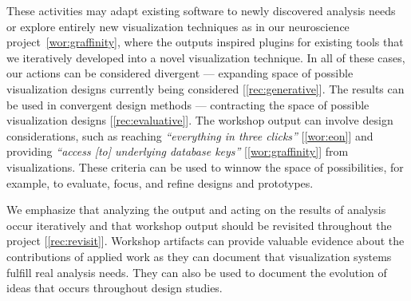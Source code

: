 These activities may adapt existing software to newly discovered analysis needs or explore entirely new visualization techniques as in our neuroscience project~\ref{wor:graffinity}, where the outputs inspired plugins for existing tools that we iteratively developed into a novel visualization technique. In all of these cases, our actions can be considered divergent --- expanding space of possible visualization designs currently being considered [\ref{rec:generative}]. The results can be used in convergent design methods --- contracting the space of possible visualization designs [\ref{rec:evaluative}]. The workshop output can involve design considerations, such as reaching \emph{``everything in three clicks''} [\ref{wor:eon}] and providing \emph{``access [to] underlying database keys''} [\ref{wor:graffinity}] from visualizations. These criteria can be used to winnow the space of possibilities, for example, to evaluate, focus, and refine designs and prototypes. 

We emphasize that analyzing the output and acting on the results of analysis occur iteratively and that workshop output should be revisited throughout the project [\ref{rec:revisit}]. Workshop artifacts can provide valuable evidence about the contributions of applied work as they can document that visualization systems fulfill real analysis needs. They can also be used to document the evolution of ideas that occurs throughout design studies.